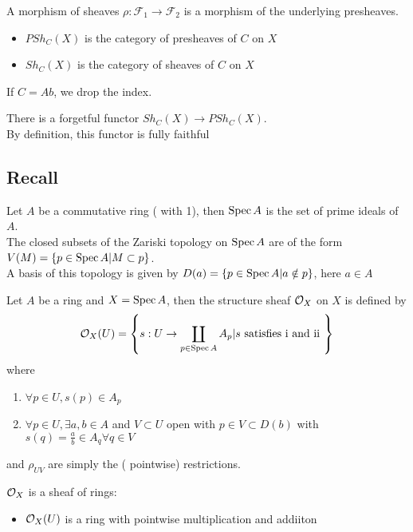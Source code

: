 \documentclass[../main.tex]{subfiles}
\begin{document}
\begin{defn}
	A morphism of sheaves $\rho: \mathcal{F}_1 \to \mathcal{F}_2$ is a morphism of the underlying presheaves.
\end{defn}
\begin{rmq}
\begin{itemize}
\item $PSh_C( X) $ is the category of presheaves of $C$ on $X$ 
\item $Sh_C( X) $ is the category of sheaves of $C$ on $X$ 
\end{itemize}
If $C= Ab$, we drop the index.
\end{rmq}
\begin{rmq}
There is a forgetful functor $Sh_C( X) \to PSh_C( X) $.\\
By definition, this functor is fully faithful
\end{rmq}
\subsection*{Recall}
Let $A$ be a commutative ring ( with 1), then $\operatorname{Spec} A$ is the set of prime ideals of $A$.\\
The closed subsets of the Zariski topology on $\operatorname{Spec} A$ are of the form $V( M) = \left\{ p \in \operatorname{Spec} A | M \subset p \right\} $.\\
A basis of this topology is given by $D( a) = \left\{ p \in \operatorname{Spec} A | a \notin p  \right\} $, here $a\in A$ 
\begin{defn}
	Let $A$ be a ring and $X= \operatorname{Spec} A$, then the structure sheaf $ \mathcal{O}_X$ on $X$ is defined by
	\[ 
	\mathcal{O}_X( U) = \left\{ s: U \to \coprod_{p \in \operatorname{Spec} A}  A_p | s \text{ satisfies i and ii }  \right\} 
	\]
	where
	\begin{enumerate}
		\item $\forall p\in U, s( p) \in A_p$
		\item $\forall p \in U, \exists a,b \in A$ and $V \subset U$ open with $p \in V \subset D( b) $ with $s( q) = \frac{a}{b}\in A_q \forall q\in V$ 
	\end{enumerate}
	and $\rho_{UV} $ are simply the ( pointwise) restrictions.
\end{defn}
\begin{rmq}
$\mathcal{O}_X$ is a sheaf of rings:
\begin{itemize}
\item $\mathcal{O}_X( U) $ is a ring with pointwise multiplication and addiiton
\end{itemize}

\end{rmq}












		
\end{document}
